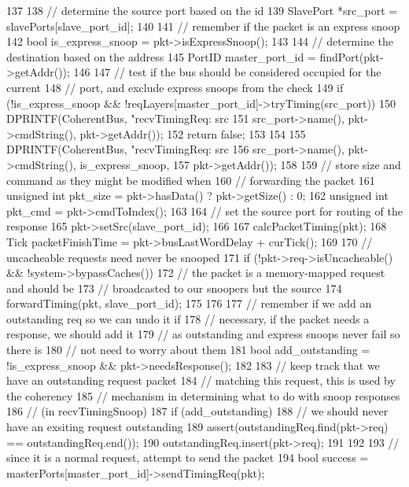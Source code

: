 \begin{DoxyCode}
137 {
138     // determine the source port based on the id
139     SlavePort *src_port = slavePorts[slave_port_id];
140 
141     // remember if the packet is an express snoop
142     bool is_express_snoop = pkt->isExpressSnoop();
143 
144     // determine the destination based on the address
145     PortID master_port_id = findPort(pkt->getAddr());
146 
147     // test if the bus should be considered occupied for the current
148     // port, and exclude express snoops from the check
149     if (!is_express_snoop && !reqLayers[master_port_id]->tryTiming(src_port)) {
150         DPRINTF(CoherentBus, "recvTimingReq: src %
151                 src_port->name(), pkt->cmdString(), pkt->getAddr());
152         return false;
153     }
154 
155     DPRINTF(CoherentBus, "recvTimingReq: src %
156             src_port->name(), pkt->cmdString(), is_express_snoop,
157             pkt->getAddr());
158 
159     // store size and command as they might be modified when
160     // forwarding the packet
161     unsigned int pkt_size = pkt->hasData() ? pkt->getSize() : 0;
162     unsigned int pkt_cmd = pkt->cmdToIndex();
163 
164     // set the source port for routing of the response
165     pkt->setSrc(slave_port_id);
166 
167     calcPacketTiming(pkt);
168     Tick packetFinishTime = pkt->busLastWordDelay + curTick();
169 
170     // uncacheable requests need never be snooped
171     if (!pkt->req->isUncacheable() && !system->bypassCaches()) {
172         // the packet is a memory-mapped request and should be
173         // broadcasted to our snoopers but the source
174         forwardTiming(pkt, slave_port_id);
175     }
176 
177     // remember if we add an outstanding req so we can undo it if
178     // necessary, if the packet needs a response, we should add it
179     // as outstanding and express snoops never fail so there is
180     // not need to worry about them
181     bool add_outstanding = !is_express_snoop && pkt->needsResponse();
182 
183     // keep track that we have an outstanding request packet
184     // matching this request, this is used by the coherency
185     // mechanism in determining what to do with snoop responses
186     // (in recvTimingSnoop)
187     if (add_outstanding) {
188         // we should never have an exsiting request outstanding
189         assert(outstandingReq.find(pkt->req) == outstandingReq.end());
190         outstandingReq.insert(pkt->req);
191     }
192 
193     // since it is a normal request, attempt to send the packet
194     bool success = masterPorts[master_port_id]->sendTimingReq(pkt);
}
\end{DoxyCode}
